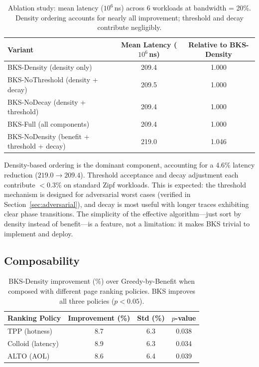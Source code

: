\documentclass{article}
\begin{document}
\begin{table}[t]
\caption{Ablation study: mean latency ($10^6$\,ns) across 6 workloads at bandwidth = 20\%. Density ordering accounts for nearly all improvement; threshold and decay contribute negligibly.}
\label{tab:ablation}
\centering
\begin{tabular}{lcc}
\toprule
Variant & Mean Latency ($10^6$\,ns) & Relative to BKS-Density \\
\midrule
BKS-Density (density only) & 209.4 & 1.000 \\
BKS-NoThreshold (density + decay) & 209.5 & 1.000 \\
BKS-NoDecay (density + threshold) & 209.4 & 1.000 \\
BKS-Full (all components) & 209.4 & 1.000 \\
\midrule
BKS-NoDensity (benefit + threshold + decay) & 219.0 & 1.046 \\
\bottomrule
\end{tabular}
\end{table}

Density-based ordering is the dominant component, accounting for a 4.6\% latency reduction ($219.0 \to 209.4$). Threshold acceptance and decay adjustment each contribute $<0.3\%$ on standard Zipf workloads. This is expected: the threshold mechanism is designed for adversarial worst cases (verified in Section~\ref{sec:adversarial}), and decay is most useful with longer traces exhibiting clear phase transitions. The simplicity of the effective algorithm---just sort by density instead of benefit---is a feature, not a limitation: it makes BKS trivial to implement and deploy.

\subsection{Composability}

\begin{table}[t]
\caption{BKS-Density improvement (\%) over Greedy-by-Benefit when composed with different page ranking policies. BKS improves all three policies ($p < 0.05$).}
\label{tab:composability}
\centering
\begin{tabular}{lccc}
\toprule
Ranking Policy & Improvement (\%) & Std (\%) & $p$-value \\
\midrule
TPP (hotness) & 8.7 & 6.3 & 0.038 \\
Colloid (latency) & 8.9 & 6.3 & 0.034 \\
ALTO (AOL) & 8.6 & 6.4 & 0.039 \\
\bottomrule
\end{tabular}
\end{table}
\end{document}
